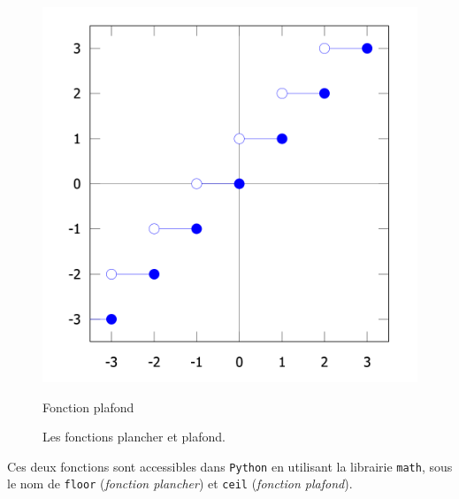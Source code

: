 \documentclass[
  letterpaper,
]{scrbook}
\theoremstyle{plain}
\theoremstyle{definition}
\theoremstyle{definition}
\theoremstyle{remark}
\begin{document}
\begin{figure}
\begin{minipage}[t]{0.50\linewidth}
{{\includegraphics{./figs/ceiling_function.png}

}

\caption{Fonction plafond}

}

\end{minipage}%

\caption{\label{fig-floor-ceiling}Les fonctions plancher et plafond.}

\end{figure}

Ces deux fonctions sont accessibles dans \texttt{Python} en utilisant la
librairie \texttt{math}, sous le nom de \texttt{floor} (\emph{fonction
plancher}) et \texttt{ceil} (\emph{fonction plafond}).
\end{document}
